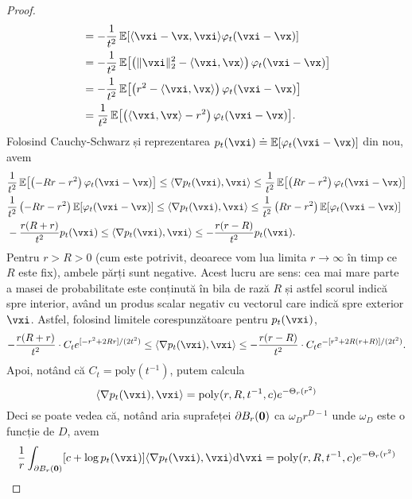 \documentclass[../../book-main_ro.tex]{subfiles}
\begin{document}
\begin{proof}
\begin{align}
        &= -\frac{1}{t^{2}}\Ex\rs{\ip{\vxi - \vx}{\vxi}\phi_{t}(\vxi - \vx)} \\
        &= -\frac{1}{t^{2}}\Ex\rs{\bp{\norm{\vxi}_{2}^{2} - \ip{\vxi}{\vx}}\phi_{t}(\vxi - \vx)} \\
        &= -\frac{1}{t^{2}}\Ex\rs{\bp{r^{2} - \ip{\vxi}{\vx}}\phi_{t}(\vxi - \vx)} \\
        &= \frac{1}{t^{2}}\Ex\rs{\bp{\ip{\vxi}{\vx} - r^{2}}\phi_{t}(\vxi - \vx)}.
    \end{align}
    Folosind Cauchy-Schwarz și reprezentarea \(p_{t}(\vxi) \doteq \Ex[\phi_{t}(\vxi - \vx)]\) din nou, avem
    \begin{align}
        &\frac{1}{t^{2}}\Ex\rs{\bp{-Rr - r^{2}}\phi_{t}(\vxi - \vx)} \leq \ip{\nabla p_{t}(\vxi)}{\vxi} \leq \frac{1}{t^{2}}\Ex\rs{\bp{Rr - r^{2}}\phi_{t}(\vxi - \vx)} \\
        &\frac{1}{t^{2}}\bp{-Rr - r^{2}}\Ex\rs{\phi_{t}(\vxi - \vx)} \leq \ip{\nabla p_{t}(\vxi)}{\vxi} \leq \frac{1}{t^{2}}\bp{Rr - r^{2}}\Ex\rs{\phi_{t}(\vxi - \vx)} \\
        &-\frac{r(R + r)}{t^{2}}p_{t}(\vxi) \leq \ip{\nabla p_{t}(\vxi)}{\vxi} \leq -\frac{r(r - R)}{t^{2}}p_{t}(\vxi).
    \end{align}
    Pentru \(r > R > 0\) (cum este potrivit, deoarece vom lua limita \(r \to \infty\) în timp ce \(R\) este fix), ambele părți sunt negative. Acest lucru are sens: cea mai mare parte a masei de probabilitate este conținută în bila de rază \(R\) și astfel scorul indică spre interior, având un produs scalar negativ cu vectorul care indică spre exterior \(\vxi\). Astfel, folosind limitele corespunzătoare pentru \(p_{t}(\vxi)\),
    \begin{equation}
        -\frac{r(R + r)}{t^{2}}\cdot C_{t}e^{[-r^{2} + 2Rr]/(2t^{2})} \leq \ip{\nabla p_{t}(\vxi)}{\vxi} \leq -\frac{r(r - R)}{t^{2}}\cdot C_{t}e^{-[r^{2} + 2R(r + R)]/(2t^{2})}.
    \end{equation}
    Apoi, notând că \(C_{t} = \mathrm{poly}(t^{-1})\), putem calcula
    \begin{equation}
        [c + \log p_{t}(\vxi)]\ip{\nabla p_{t}(\vxi)}{\vxi} = \mathrm{poly}(r, R, t^{-1}, c)e^{-\Theta_{r}(r^{2})}
    \end{equation}
    Deci se poate vedea că, notând aria suprafeței \(\partial B_{r}(\bm{0})\) ca \(\omega_{D} r^{D - 1}\) unde \(\omega_{D}\) este o funcție de \(D\), avem
    \begin{equation}
        \frac{1}{r}\int_{\partial B_{r}(\vzero)}[c + \log p_{t}(\vxi)]\ip{\nabla p_{t}(\vxi)}{\vxi}\odif{\vxi} = \mathrm{poly}(r, R, t^{-1}, c)e^{-\Theta_{r}(r^{2})}

\end{equation}
\end{proof}
\end{document}
